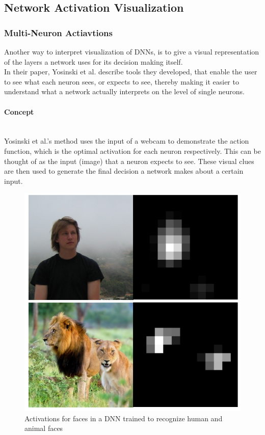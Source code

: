 \documentclass{acmsiggraph}               %
\newcommand{\paragraphbr}[1]{\paragraph{#1}\mbox{}\\}
\begin{document}
\subsection{Network Activation Visualization}
\subsubsection{Multi-Neuron Actiavtions}
Another way to interpret visualization of DNNs, is to give a visual representation of the layers a network uses for its decision making itself.\\ 
In their paper, Yosinski et al. describe tools they developed, that enable the user to see what each neuron sees, or expects to see, thereby making it easier to understand what a network actually interprets on the level of single neurons. \cite{Yosinski2015}

\paragraphbr{Concept}

Yosinski et al.'s method uses the input of a webcam to demonstrate the action function, which is the optimal activation for each neuron respectively. This can be thought of as the input (image) that a neuron expects to see. These visual clues are then used to generate the final decision a network makes about a certain input.

\begin{figure}[H]
\includegraphics[scale=0.5]{detection_yosinski_et_al}
\caption{Activations for faces in a DNN trained to recognize human and animal faces \protect\cite{Yosinski2015}}
\label{fig:face_detection}
\centering
\end{figure}
\end{document}
